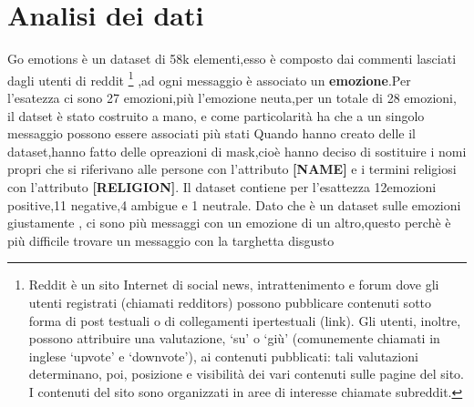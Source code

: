 \documentclass{article}
\begin{document}
    \section{Analisi dei dati} \label{sec:analisi-dei-dati}
Go emotions è un dataset di 58k elementi,esso è composto dai commenti lasciati dagli utenti di  reddit \footnote{Reddit è un sito Internet di social news, intrattenimento e forum dove gli utenti registrati (chiamati redditors) possono pubblicare contenuti sotto forma di post testuali o di collegamenti ipertestuali (link). Gli utenti, inoltre, possono attribuire una valutazione, ‘su’ o ‘giù’ (comunemente chiamati in inglese ‘upvote’ e ‘downvote’), ai contenuti pubblicati: tali valutazioni determinano, poi, posizione e visibilità dei vari contenuti sulle pagine del sito. I contenuti del sito sono organizzati in aree di interesse chiamate subreddit.} ,ad ogni messaggio è associato un \textbf{emozione}.Per l'esatezza ci sono 27 emozioni,più l'emozione neuta,per un totale di 28 emozioni,
il datset è stato costruito a mano, e come particolarità ha che a un singolo messaggio possono essere associati più stati
Quando hanno creato delle il dataset,hanno fatto delle opreazioni di mask,cioè hanno deciso di sostituire i nomi propri che si riferivano alle persone con l'attributo \textbf{[NAME]} e i termini religiosi con l'attributo \textbf{[RELIGION]}.
Il dataset contiene per l'esattezza 12emozioni positive,11 negative,4 ambigue e 1 neutrale.
Dato che è un dataset sulle emozioni giustamente , ci sono più messaggi con un emozione di un altro,questo perchè è più difficile trovare un messaggio con la targhetta disgusto
\end{document}
